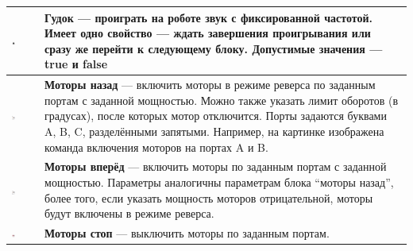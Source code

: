 \documentclass[a4paper,12pt,twoside]{article}
\begin{document}
\begin{center}
	\begin{tabular}{m{} | m{}}
    {\vspace{10pt}\includegraphics[width=0.15\textwidth]{Beep.png}}          & \textbf{Гудок} --- проиграть на роботе звук с фиксированной частотой. Имеет одно свойство --- ждать завершения проигрывания или сразу же перейти к следующему блоку. Допустимые значения --- true и false\\ \hline
    {\vspace{10pt}\includegraphics[width=0.15\textwidth]{MotorBackward.png}} & \textbf{Моторы назад} --- включить моторы в режиме реверса по заданным портам с заданной мощностью. Можно также указать лимит оборотов (в градусах), после которых мотор отключится. Порты задаются буквами A, B, C, разделёнными запятыми. Например, на картинке изображена команда включения моторов на портах A и B. \\ \hline
    {\vspace{10pt}\includegraphics[width=0.15\textwidth]{MotorForward.png}}  & \textbf{Моторы вперёд} --- включить моторы по заданным портам с заданной мощностью. Параметры аналогичны параметрам блока "`моторы назад"', более того, если указать мощность моторов отрицательной, моторы будут включены в режиме реверса. \\  \hline
    {\vspace{10pt}\includegraphics[width=0.15\textwidth]{MotorStop.png}}     & \textbf{Моторы стоп} --- выключить моторы по заданным портам. \\ \hline

\end{tabular}
\end{center}
\end{document}
